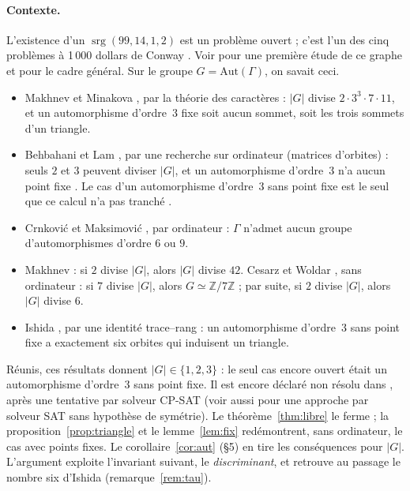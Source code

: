 \documentclass[11pt,a4paper]{article}
\theoremstyle{remark}
\newcommand{\Z}{\mathbb{Z}}
\newcommand{\srg}{\operatorname{srg}}
\begin{document}
\paragraph{Contexte.} L'existence d'un $\srg(99,14,1,2)$ est un problème ouvert ; c'est l'un des cinq problèmes à 1\,000 dollars de
Conway \cite{Co}. Voir \cite{W84} pour une première étude de ce graphe et \cite{BVM22} pour le cadre général. Sur le groupe
$G=\mathrm{Aut}(\Gamma)$, on savait ceci.
\begin{itemize}[leftmargin=*,nosep]
\item Makhnev et Minakova \cite{MM04}, par la théorie des caractères : $|G|$ divise $2\cdot3^3\cdot7\cdot11$, et un
automorphisme d'ordre~3 fixe soit aucun sommet, soit les trois sommets d'un triangle.
\item Behbahani et Lam \cite{B09,BL11}, par une recherche sur ordinateur (matrices d'orbites) : seuls $2$ et $3$ peuvent diviser
$|G|$, et un automorphisme d'ordre~3 n'a aucun point fixe \cite[th.~4.14]{B09}. Le cas d'un automorphisme d'ordre~3 sans point
fixe est le seul que ce calcul n'a pas tranché \cite[table~21]{B09}.
\item Crnković et Maksimović \cite{CM20}, par ordinateur : $\Gamma$ n'admet aucun groupe d'automorphismes d'ordre $6$ ou $9$.
\item Makhnev \cite[cor.~2.4]{Mak10} : si $2$ divise $|G|$, alors $|G|$ divise $42$. Cesarz et Woldar \cite{CW25}, sans
ordinateur : si $7$ divise $|G|$, alors $G\simeq\Z/7\Z$ ; par suite, si $2$ divise $|G|$, alors $|G|$ divise $6$.
\item Ishida \cite[prop.~8.7]{I26}, par une identité trace--rang : un automorphisme d'ordre~3 sans point fixe a exactement six
orbites qui induisent un triangle.
\end{itemize}
Réunis, ces résultats donnent $|G|\in\{1,2,3\}$ : le seul cas encore ouvert était un automorphisme d'ordre~3 sans point fixe.
Il est encore déclaré non résolu dans \cite{TS26}, après une tentative par solveur CP-SAT (voir aussi \cite{K26} pour une
approche par solveur SAT sans hypothèse de symétrie). Le théorème~\ref{thm:libre} le ferme ; la proposition~\ref{prop:triangle}
et le lemme~\ref{lem:fix} redémontrent, sans ordinateur, le cas avec points fixes. Le corollaire~\ref{cor:aut} (§5) en tire les
conséquences pour $|G|$. L'argument exploite l'invariant suivant, le \emph{discriminant}, et retrouve au passage le nombre six
d'Ishida (remarque~\ref{rem:tau}).

\end{document}
